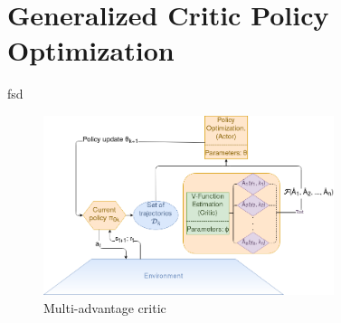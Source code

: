 \section{Generalized Critic Policy Optimization}
\label{sec:method}



fsd 
\begin{figure}[!htb]
\includegraphics[width=8.5cm]{images/model}
\caption{Multi-advantage critic}
\label{fig:model}
\end{figure}
